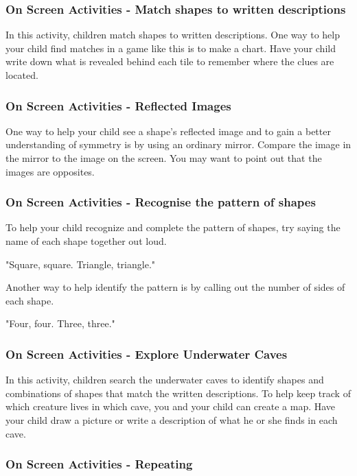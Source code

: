 \subsubsection{On Screen Activities - Match shapes to written descriptions}

In this activity, children match shapes to written descriptions.
One way to help your child find matches in a game like this is to make a chart.
Have your child write down what is revealed behind each tile to remember where the clues are located.

\subsubsection{On Screen Activities - Reflected Images}

One way to help your child see a shape's reflected image and to gain a better understanding of symmetry is by using an ordinary mirror.
Compare the image in the mirror to the image on the screen.
You may want to point out that the images are opposites.

\subsubsection{On Screen Activities - Recognise the pattern of shapes}

To help your child recognize and complete the pattern of shapes, try saying the name of each shape together out loud.

"Square, square. Triangle, triangle."

Another way to help identify the pattern is by calling out the number of sides of each shape.

"Four, four. Three, three."

\subsubsection{On Screen Activities - Explore Underwater Caves}

In this activity, children search the underwater caves to identify shapes and combinations of shapes that match the written descriptions.
To help keep track of which creature lives in which cave, you and your child can create a map.
Have your child draw a picture or write a description of what he or she finds in each cave.

\subsubsection{On Screen Activities - Repeating}

